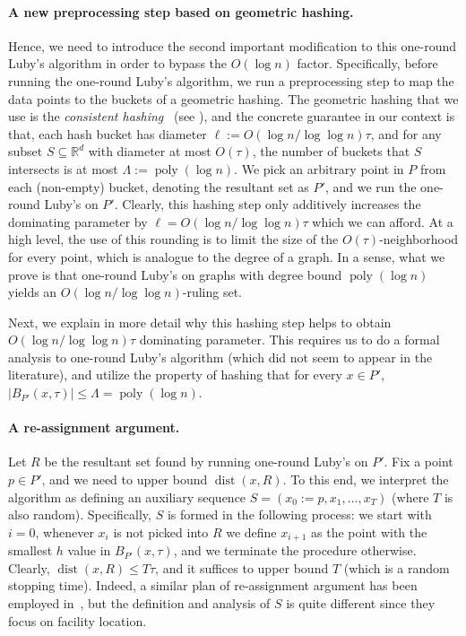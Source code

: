 \documentclass[11pt,letterpaper]{article}
\theoremstyle{plain}
\theoremstyle{definition}
\theoremstyle{remark}
\DeclareMathOperator{\poly}{poly}
\DeclareMathOperator{\dist}{dist}
\begin{document}
\paragraph{A new preprocessing step based on geometric hashing.}
Hence, we need to introduce the second important modification to this one-round Luby's algorithm in order to bypass the $O(\log n)$ factor.
Specifically, before running the one-round Luby's algorithm,
we run a preprocessing step to map the data points to the buckets of a geometric hashing.
The geometric hashing that we use is the \emph{consistent hashing}~\cite{CJKVY22} (see ),
and the concrete guarantee in our context is that, each hash bucket has diameter $\ell := O(\log n / \log \log n)\tau$,
and for any subset $S \subseteq \mathbb{R}^d$ with diameter at most $O(\tau)$,
the number of buckets that $S$ intersects is at most $\Lambda := \poly(\log n)$.
We pick an arbitrary point in $P$ from each (non-empty) bucket, denoting the resultant set as $P'$,
and we run the one-round Luby's on $P'$.
Clearly, this hashing step only additively increases the dominating parameter by $\ell = O(\log n / \log\log n)\tau$ which we can afford.
At a high level, the use of this rounding is to limit the size of the $O(\tau)$-neighborhood for every point,
which is analogue to the degree of a graph.
In a sense, what we prove is that one-round Luby's on graphs with degree bound $\poly(\log n)$ yields an $O(\log n / \log\log n)$-ruling set.

Next, we explain in more detail why this hashing step helps to obtain $O(\log n / \log\log n)\tau$ dominating parameter.
This requires us to do a formal analysis to one-round Luby's algorithm (which did not seem to appear in the literature),
and utilize the property of hashing that for every $x\in P'$, $|B_{P'}(x, \tau)| \leq \Lambda = \poly(\log n)$.

\paragraph{A re-assignment argument.}
Let $R$ be the resultant set found by running one-round Luby's on $P'$.
Fix a point $p \in P'$, and we need to upper bound $\dist(x, R)$.
To this end, we interpret the algorithm as defining an auxiliary sequence $S = (x_0 := p, x_1, \ldots, x_T)$ (where $T$ is also random).
Specifically, $S$ is formed in the following process: we start with $i = 0$,
whenever $x_{i}$ is not picked into $R$ we define $x_{i + 1}$ as the point with the smallest $h$ value in $B_{P'}(x, \tau)$,
and we terminate the procedure otherwise.
Clearly, $\dist(x, R) \leq T \tau$, and it suffices to upper bound $T$ (which is a random stopping time).
Indeed, a similar plan of re-assignment argument has been employed in~\cite{CGJKV24},
but the definition and analysis of $S$ is quite different since they focus on facility location.
\end{document}
